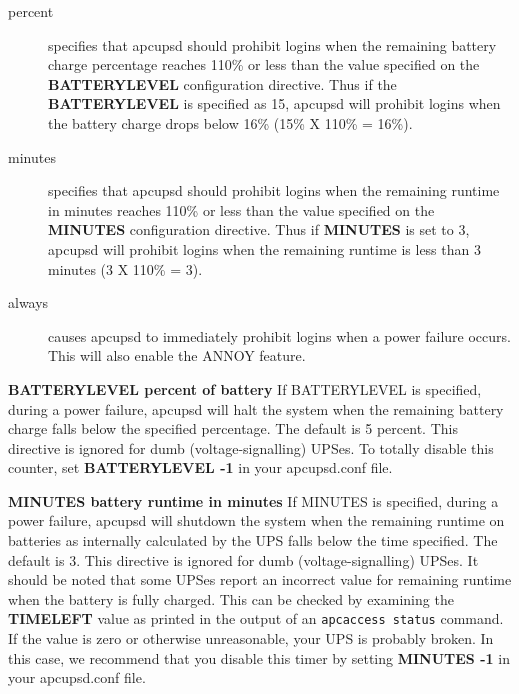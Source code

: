 {{{{{{{{{\begin{description}
\begin{description}
\item [percent]
   specifies that apcupsd should prohibit logins when the remaining battery
charge percentage reaches 110\% or less than the value specified on the {\bf
BATTERYLEVEL} configuration directive. Thus if the {\bf BATTERYLEVEL} is
specified as 15, apcupsd will prohibit logins when the battery charge drops
below 16\% (15\% X 110\% = 16\%).  

\item [minutes]
   specifies that apcupsd should prohibit logins when the remaining runtime in
minutes reaches 110\% or less than the value specified on the {\bf MINUTES}
configuration directive.  Thus if {\bf MINUTES} is set to 3, apcupsd will
prohibit logins when the remaining runtime is less than 3 minutes (3 X 110\% =
3).  

\item [always]
   causes apcupsd to immediately prohibit logins when a power failure occurs.
This will also enable the ANNOY feature. 
\end{description}


\item {\bf BATTERYLEVEL \lt{}percent of battery\gt{}}
   If BATTERYLEVEL is specified, during a power failure, apcupsd will halt the
system when the remaining battery charge falls below the specified percentage.
The default is 5 percent. This directive is ignored for dumb
(voltage-signalling) UPSes. To totally disable this counter, set {\bf
BATTERYLEVEL -1} in your apcupsd.conf file.  

\item {\bf MINUTES \lt{}battery runtime in minutes\gt{}}
   If MINUTES is specified, during a power failure, apcupsd will shutdown the
system when the remaining runtime on batteries as internally calculated by the
UPS falls below the time specified. The default is 3. This directive is
ignored for dumb (voltage-signalling) UPSes. It should be noted that some
UPSes report an incorrect value for remaining runtime when the battery is
fully charged. This can be checked by examining the {\bf TIMELEFT} value as
printed in the output of an {\tt apcaccess status} command. If the value is
zero or otherwise unreasonable, your UPS is probably broken. In this case, we
recommend that you disable this timer by setting {\bf MINUTES -1} in your
apcupsd.conf file.  


\end{description}}}}}}}}}}
